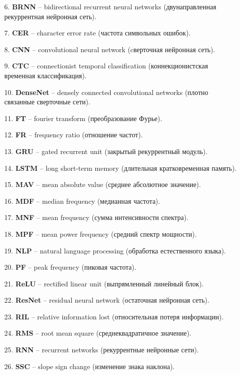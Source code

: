 \begin{itemize}
    \item[6.]  \textbf{BRNN} -- bidirectional recurrent neural networks (двунаправленная рекуррентная нейронная сеть).
    \item[7.]  \textbf{CER} -- character error rate (частота символьных ошибок).
    \item[8.]  \textbf{CNN} -- convolutional neural network (cверточная нейронная сеть).
    \item[9.]  \textbf{CTC} -- connectionist temporal classification (коннекционистская временная классификация).
    \item[10.] \textbf{DenseNet} -- densely connected convolutional networks (плотно связанные сверточные сети).
    \item[11.] \textbf{FT} -- fourier transform (преобразование Фурье).
    \item[12.] \textbf{FR} -- frequency ratio (отношение частот).
    \item[13.] \textbf{GRU} -- gated recurrent unit (закрытый рекуррентный модуль).
    \item[14.] \textbf{LSTM} -- long short-term memory (длительная кратковременная память).
    \item[15.] \textbf{MAV} -- mean absolute value (среднее абсолютное значение).
    \item[16.] \textbf{MDF} -- median frequency (медианная частота).
    \item[17.] \textbf{MNF} -- mean frequency (сумма интенсивности спектра).
    \item[18.] \textbf{MPF} -- mean power frequency (средний спектр мощности).
    \item[19.] \textbf{NLP} -- natural language processing (обработка естественного языка).
    \item[20.] \textbf{PF} -- peak frequency (пиковая частота).
    \item[21.] \textbf{ReLU} -- rectified linear unit (выпрямленный линейный блок).
    \item[22.] \textbf{ResNet} -- residual neural network (остаточная нейронная сеть).
    \item[23.] \textbf{RIL} -- relative information lost (относительная потеря информации).
    \item[24.] \textbf{RMS} -- root mean square (среднеквадратичное значение).
    \item[25.] \textbf{RNN} -- recurrent networks (рекуррентные нейронные сети).
    \item[26.] \textbf{SSC} -- slope sign change (изменение знака наклона).

\end{itemize}
